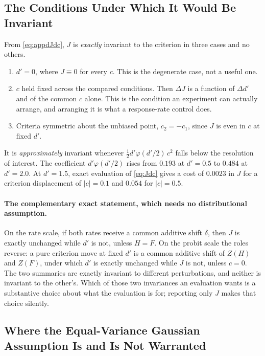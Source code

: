 \subsection{The Conditions Under Which It Would Be Invariant}
\label{app:sdt-conditions}

From \eqref{eq:appdJdc}, $J$ is \emph{exactly} invariant to the criterion in three cases and no others.

\begin{enumerate}
\itemsep0em
\item $d' = 0$, where $J \equiv 0$ for every $c$. This is the degenerate case, not a useful one.
\item $c$ held fixed across the compared conditions. Then $\Delta J$ is a function of $\Delta d'$ and
of the common $c$ alone. This is the condition an experiment can actually arrange, and arranging it
is what a response-rate control does.
\item Criteria symmetric about the unbiased point, $c_2 = -c_1$, since $J$ is even in $c$ at fixed
$d'$.
\end{enumerate}

\noindent It is \emph{approximately} invariant whenever
$\tfrac{1}{2}d'\varphi(d'/2)\,c^2$ falls below the resolution of interest. The coefficient
$d'\varphi(d'/2)$ rises from $0.193$ at $d' = 0.5$ to $0.484$ at $d' = 2.0$. At $d' = 1.5$, exact
evaluation of \eqref{eq:Jdc} gives a cost of $0.0023$ in $J$ for a criterion displacement of
$|c| = 0.1$ and $0.054$ for $|c| = 0.5$.

\paragraph{The complementary exact statement, which needs no distributional assumption.} On the rate
scale, if both rates receive a common additive shift $\delta$, then $J$ is exactly unchanged while
$d'$ is not, unless $H = F$. On the probit scale the roles reverse: a pure criterion move at fixed
$d'$ is a common additive shift of $Z(H)$ and $Z(F)$, under which $d'$ is exactly unchanged while $J$
is not, unless $c = 0$. The two summaries are exactly invariant to different perturbations, and
neither is invariant to the other's. Which of those two invariances an evaluation wants is a
substantive choice about what the evaluation is for; reporting only $J$ makes that choice silently.

\subsection{Where the Equal-Variance Gaussian Assumption Is and Is Not Warranted}
\label{app:sdt-assumptions}

